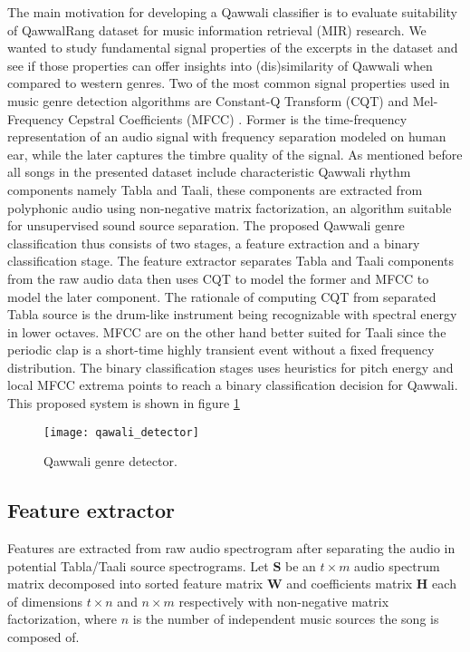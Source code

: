 \documentclass{article}
\begin{document}
The main motivation for developing a Qawwali classifier is to evaluate suitability of QawwalRang dataset for music information retrieval (MIR) research. We wanted to study fundamental signal properties of the excerpts in the dataset and see if those properties can offer insights into (dis)similarity of Qawwali when compared to western genres. Two of the most common signal properties used in music genre detection algorithms are Constant-Q Transform (CQT) and Mel-Frequency Cepstral Coefficients (MFCC) \citep{panagakis}. Former is the time-frequency representation of an audio signal with frequency separation modeled on human ear, while the later captures the timbre quality of the signal. As mentioned before all songs in the presented dataset include characteristic Qawwali rhythm components namely Tabla and Taali, these components are extracted from polyphonic audio using non-negative matrix factorization, an algorithm \citep{virtanen} suitable for unsupervised sound source separation.
The proposed Qawwali genre classification thus consists of two stages, a feature extraction and a binary classification stage. The feature extractor separates Tabla and Taali components from the raw audio data then uses CQT to model the former and MFCC to model the later component. The rationale of computing CQT from separated Tabla source is the drum-like instrument being recognizable with spectral energy in lower octaves. MFCC are on the other hand better suited for Taali since the periodic clap is a short-time highly transient event without a fixed frequency distribution. The binary classification stages uses heuristics for pitch energy and local MFCC extrema points to reach a binary classification decision for Qawwali. This proposed system is shown in figure \ref{fig:block_dia}
\begin{figure}[htbp]
  \centering
  \texttt{[image: qawali\_detector]}
  \caption{Qawwali genre detector.}
\label{fig:block_dia}
\end{figure}

\subsection{Feature extractor}

Features are extracted from raw audio spectrogram after separating the audio in potential Tabla/Taali source spectrograms. Let $\boldsymbol{S}$ be an ${t\times  m}$ audio spectrum matrix decomposed into sorted feature matrix $\boldsymbol{W}$ and coefficients matrix $\boldsymbol{H}$ each of dimensions ${t\times n}$ and ${n\times m}$ respectively with non-negative matrix factorization, where $n$ is the number of independent music sources the song is composed of.
\end{document}
